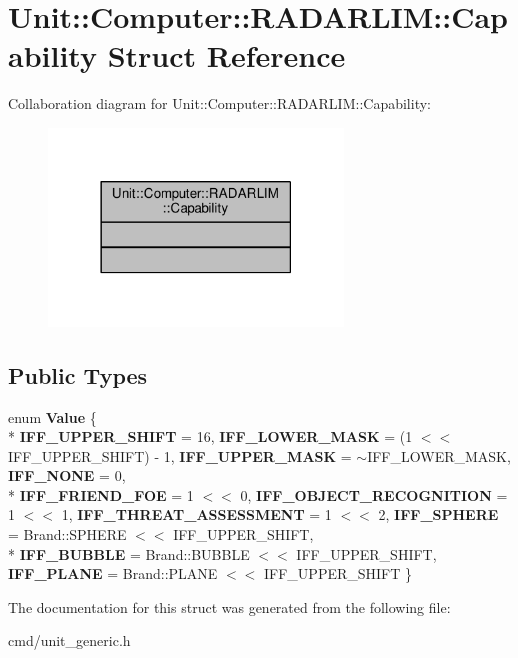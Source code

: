 \hypertarget{structUnit_1_1Computer_1_1RADARLIM_1_1Capability}{}\section{Unit\+:\+:Computer\+:\+:R\+A\+D\+A\+R\+L\+IM\+:\+:Capability Struct Reference}
\label{structUnit_1_1Computer_1_1RADARLIM_1_1Capability}


Collaboration diagram for Unit\+:\+:Computer\+:\+:R\+A\+D\+A\+R\+L\+IM\+:\+:Capability\+:
\nopagebreak
\begin{figure}[H]
\begin{center}
\leavevmode
\includegraphics[width=222pt]{df/dfb/structUnit_1_1Computer_1_1RADARLIM_1_1Capability__coll__graph}
\end{center}
\end{figure}
\subsection*{Public Types}
\begin{DoxyCompactItemize}
\item 
enum {\bfseries Value} \{ \\*
{\bfseries I\+F\+F\+\_\+\+U\+P\+P\+E\+R\+\_\+\+S\+H\+I\+FT} = 16, 
{\bfseries I\+F\+F\+\_\+\+L\+O\+W\+E\+R\+\_\+\+M\+A\+SK} = (1 $<$$<$ I\+F\+F\+\_\+\+U\+P\+P\+E\+R\+\_\+\+S\+H\+I\+FT) -\/ 1, 
{\bfseries I\+F\+F\+\_\+\+U\+P\+P\+E\+R\+\_\+\+M\+A\+SK} = $\sim$\+I\+F\+F\+\_\+\+L\+O\+W\+E\+R\+\_\+\+M\+A\+SK, 
{\bfseries I\+F\+F\+\_\+\+N\+O\+NE} = 0, 
\\*
{\bfseries I\+F\+F\+\_\+\+F\+R\+I\+E\+N\+D\+\_\+\+F\+OE} = 1 $<$$<$ 0, 
{\bfseries I\+F\+F\+\_\+\+O\+B\+J\+E\+C\+T\+\_\+\+R\+E\+C\+O\+G\+N\+I\+T\+I\+ON} = 1 $<$$<$ 1, 
{\bfseries I\+F\+F\+\_\+\+T\+H\+R\+E\+A\+T\+\_\+\+A\+S\+S\+E\+S\+S\+M\+E\+NT} = 1 $<$$<$ 2, 
{\bfseries I\+F\+F\+\_\+\+S\+P\+H\+E\+RE} = Brand\+:\+:S\+P\+H\+E\+RE $<$$<$ I\+F\+F\+\_\+\+U\+P\+P\+E\+R\+\_\+\+S\+H\+I\+FT, 
\\*
{\bfseries I\+F\+F\+\_\+\+B\+U\+B\+B\+LE} = Brand\+:\+:B\+U\+B\+B\+LE $<$$<$ I\+F\+F\+\_\+\+U\+P\+P\+E\+R\+\_\+\+S\+H\+I\+FT, 
{\bfseries I\+F\+F\+\_\+\+P\+L\+A\+NE} = Brand\+:\+:P\+L\+A\+NE $<$$<$ I\+F\+F\+\_\+\+U\+P\+P\+E\+R\+\_\+\+S\+H\+I\+FT
 \}\hypertarget{structUnit_1_1Computer_1_1RADARLIM_1_1Capability_a6d3c2ee59c7e761596b2e1d2ab318a9d}{}\label{structUnit_1_1Computer_1_1RADARLIM_1_1Capability_a6d3c2ee59c7e761596b2e1d2ab318a9d}

\end{DoxyCompactItemize}


The documentation for this struct was generated from the following file\+:\begin{DoxyCompactItemize}
\item 
cmd/unit\+\_\+generic.\+h\end{DoxyCompactItemize}
